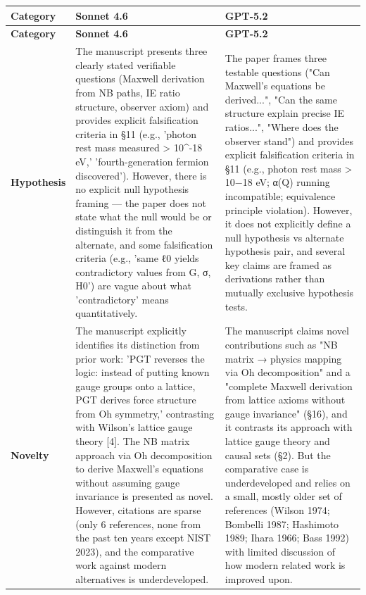 \documentclass[11pt]{article}
\begin{document}
\begin{longtable}{@{} p{2.2cm} p{6.3cm} p{6.3cm} @{}}
\toprule
\textbf{Category} & \textbf{Sonnet 4.6} & \textbf{GPT-5.2} \\
\midrule
\endfirsthead
\toprule
\textbf{Category} & \textbf{Sonnet 4.6} & \textbf{GPT-5.2} \\
\midrule
\endhead
\bottomrule
\endlastfoot

\rowcolor{rowgray}
\textbf{Hypothesis} &
The manuscript presents three clearly stated verifiable questions (Maxwell derivation from NB paths, IE ratio structure, observer axiom) and provides explicit falsification criteria in §11 (e.g., 'photon rest mass measured > 10\textasciicircum{}-18 eV,' 'fourth-generation fermion discovered'). However, there is no explicit null hypothesis framing — the paper does not state what the null would be or distinguish it from the alternate, and some falsification criteria (e.g., 'same ℓ0 yields contradictory values from G, σ, H0') are vague about what 'contradictory' means quantitatively. &
The paper frames three testable questions ("Can Maxwell’s equations be derived...", "Can the same structure explain precise IE ratios...", "Where does the observer stand") and provides explicit falsification criteria in §11 (e.g., photon rest mass > 10−18 eV; α(Q) running incompatible; equivalence principle violation). However, it does not explicitly define a null hypothesis vs alternate hypothesis pair, and several key claims are framed as derivations rather than mutually exclusive hypothesis tests. \\[6pt]

\textbf{Novelty} &
The manuscript explicitly identifies its distinction from prior work: 'PGT reverses the logic: instead of putting known gauge groups onto a lattice, PGT derives force structure from Oh symmetry,' contrasting with Wilson's lattice gauge theory [4]. The NB matrix approach via Oh decomposition to derive Maxwell's equations without assuming gauge invariance is presented as novel. However, citations are sparse (only 6 references, none from the past ten years except NIST 2023), and the comparative work against modern alternatives is underdeveloped. &
The manuscript claims novel contributions such as "NB matrix → physics mapping via Oh decomposition" and a "complete Maxwell derivation from lattice axioms without gauge invariance" (§16), and it contrasts its approach with lattice gauge theory and causal sets (§2). But the comparative case is underdeveloped and relies on a small, mostly older set of references (Wilson 1974; Bombelli 1987; Hashimoto 1989; Ihara 1966; Bass 1992) with limited discussion of how modern related work is improved upon. \\[6pt]


\end{longtable}
\end{document}
